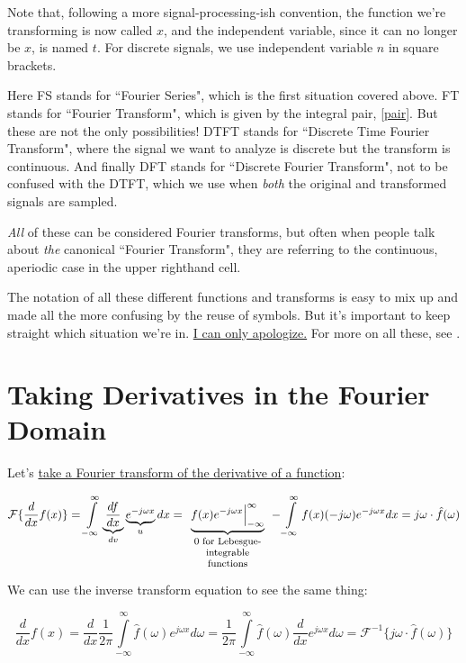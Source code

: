 \documentclass[10pt]{article}
\begin{document}
Note that, following a more signal-processing-ish convention\cite{oppenheim}, the function we're transforming is now called $x$, and the independent variable, since it can no longer be $x$, is named $t$. For discrete signals, we use independent variable $n$ in square brackets.

Here FS stands for ``Fourier Series", which is the first situation covered above. FT stands for ``Fourier Transform", which is given by the integral pair, \autoref{pair}. But these are not the only possibilities! DTFT stands for ``Discrete Time Fourier Transform", where the signal we want to analyze is discrete but the transform is continuous. And finally DFT stands for ``Discrete Fourier Transform", not to be confused with the DTFT, which we use when \textit{both} the original and transformed signals are sampled.

\textit{All} of these can be considered Fourier transforms, but often when people talk about \textit{the} canonical ``Fourier Transform", they are referring to the continuous, aperiodic case in the upper righthand cell.

The notation of all these different functions and transforms is easy to mix up and made all the more confusing by the reuse of symbols. But it's important to keep straight which situation we're in. \href{https://www.youtube.com/watch?v=6ITWKtTYlEI&t=69s}{I can only apologize.} For more on all these, see \cite{oppenheim}.

\section{Taking Derivatives in the Fourier Domain}\label{derivative}

Let's \href{https://www.youtube.com/watch?v=d5d0ORQHNYs}{take a Fourier transform of the derivative of a function}\cite{brunton}:

$$\mathcal{F}\{\frac{d}{dx} f(x)\} = \int\limits_{-\infty}^{\infty} \underbrace{\frac{df}{dx}}_{dv} \underbrace{e^{-j \omega x}}_{u} dx = \underbrace{f(x) e^{-j \omega x} \Big|_{-\infty}^{\infty}}_{\parbox{25mm}{\footnotesize \centering 0 for Lebesgue-integrable functions}} - \int\limits_{-\infty}^{\infty} f(x) (-j \omega) e^{-j \omega x} dx = j \omega \cdot \hat{f}(\omega)$$

We can use the inverse transform equation to see the same thing:

$$\frac{d}{dx} f(x) = \frac{d}{dx} \frac{1}{2\pi} \int\limits_{-\infty}^{\infty} \hat{f}(\omega) e^{j \omega x} d \omega = \frac{1}{2\pi} \int\limits_{-\infty}^{\infty} \hat{f}(\omega) \frac{d}{dx} e^{j \omega x} d \omega = \mathcal{F}^{-1}\{j \omega \cdot \hat{f}(\omega)\}$$
\end{document}
